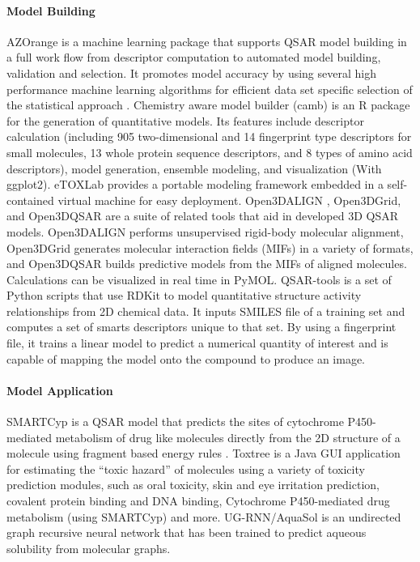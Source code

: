 \paragraph{Model Building}
AZOrange is a machine learning package that supports QSAR model building in a full work flow from descriptor computation to automated model building, validation and selection. It promotes model accuracy by using several high performance machine learning algorithms for efficient data set specific selection of the statistical approach \cite{St_lring_2011}.
Chemistry aware model builder (camb) \cite{Murrell_2015} is an R package for the generation of quantitative models. Its features include descriptor calculation (including 905 two-dimensional and 14 fingerprint type descriptors for small molecules, 13 whole protein sequence descriptors, and 8 types of amino acid descriptors), model generation, ensemble modeling, and visualization (With ggplot2).
eTOXLab \cite{Carri__2015} provides a portable modeling framework embedded in a self-contained virtual machine for easy deployment.
Open3DALIGN  \cite{Tosco_2011}, Open3DGrid, and Open3DQSAR \cite{Tosco_2010} are a suite of related tools that aid in developed 3D QSAR models.  Open3DALIGN performs unsupervised rigid-body molecular alignment, Open3DGrid generates molecular interaction fields (MIFs) in a variety of formats, and Open3DQSAR builds predictive models from the MIFs of aligned molecules.  Calculations can be visualized in real time in PyMOL.
QSAR-tools is a set of Python scripts that use RDKit to model quantitative structure activity relationships from 2D chemical data. It inputs SMILES file of a training set and computes a set of smarts descriptors unique to that set. By using a fingerprint file, it trains a linear model to predict a numerical quantity of interest and is capable of mapping the model onto the compound to produce an image.

\paragraph{Model Application}
SMARTCyp is a QSAR model that predicts the sites of cytochrome P450-mediated metabolism of drug like molecules directly from the 2D structure of a molecule using fragment based energy rules \cite{Rydberg_2010}.
Toxtree  \cite{Patlewicz_2008} is a Java GUI application for estimating the ``toxic hazard'' of molecules using a variety of toxicity prediction modules, such as oral toxicity, skin  and eye irritation prediction, covalent protein binding and DNA binding, Cytochrome P450-mediated drug metabolism (using SMARTCyp) and more.
UG-RNN/AquaSol \cite{Lusci_2013} is an undirected graph recursive neural network that has been trained to predict aqueous solubility from molecular graphs. 

